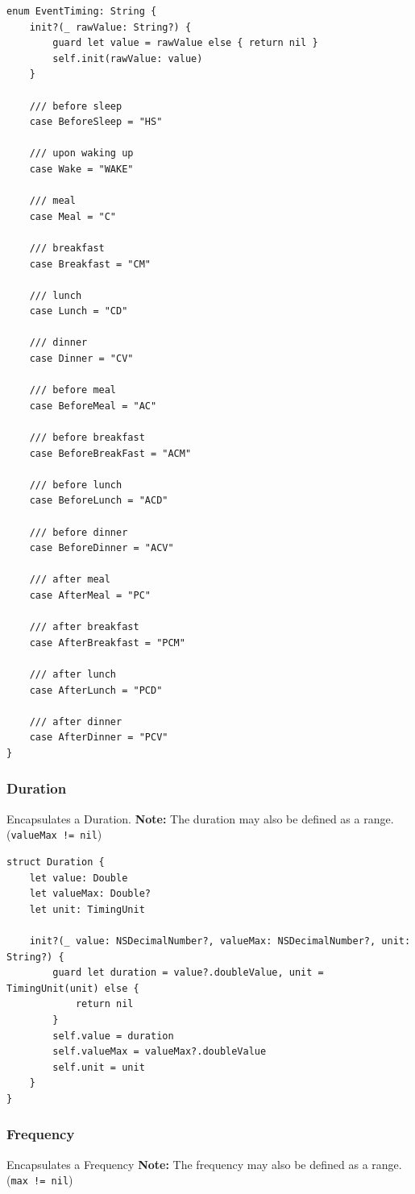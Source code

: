 \documentclass{article}
\begin{document}
\begin{verbatim}
enum EventTiming: String {
    init?(_ rawValue: String?) {
        guard let value = rawValue else { return nil }
        self.init(rawValue: value)
    }

    /// before sleep
    case BeforeSleep = "HS"

    /// upon waking up
    case Wake = "WAKE"

    /// meal
    case Meal = "C"

    /// breakfast
    case Breakfast = "CM"

    /// lunch
    case Lunch = "CD"

    /// dinner
    case Dinner = "CV"

    /// before meal
    case BeforeMeal = "AC"

    /// before breakfast
    case BeforeBreakFast = "ACM"

    /// before lunch
    case BeforeLunch = "ACD"

    /// before dinner
    case BeforeDinner = "ACV"

    /// after meal
    case AfterMeal = "PC"

    /// after breakfast
    case AfterBreakfast = "PCM"

    /// after lunch
    case AfterLunch = "PCD"

    /// after dinner
    case AfterDinner = "PCV"
}
\end{verbatim}

\subsubsection{Duration}\label{duration}
Encapsulates a Duration. \textbf{Note:} The duration may
also be defined as a range. (\texttt{valueMax\ !=\ nil})

\begin{verbatim}
struct Duration {
    let value: Double
    let valueMax: Double?
    let unit: TimingUnit

    init?(_ value: NSDecimalNumber?, valueMax: NSDecimalNumber?, unit: String?) {
        guard let duration = value?.doubleValue, unit = TimingUnit(unit) else {
            return nil
        }
        self.value = duration
        self.valueMax = valueMax?.doubleValue
        self.unit = unit
    }
}
\end{verbatim}

\subsubsection{Frequency}\label{frequency}
Encapsulates a Frequency \textbf{Note:} The frequency may
also be defined as a range. (\texttt{max\ !=\ nil})
\end{document}
